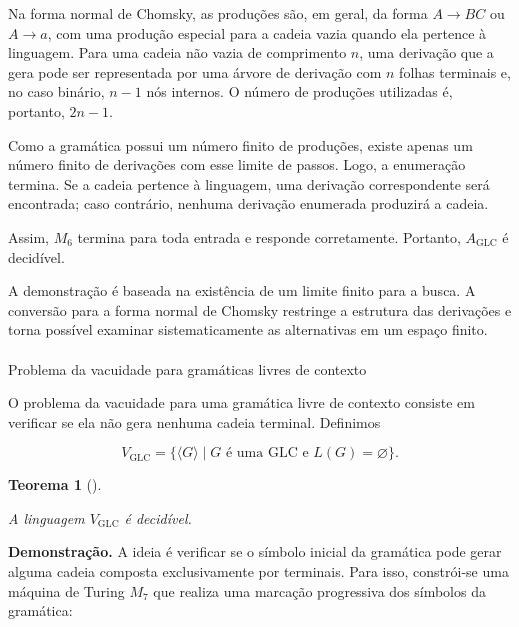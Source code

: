 \documentclass[
  brazilian,
  letterpaper,
]{book}
\makeatletter
\let\oldparagraph\paragraph
\renewcommand{\paragraph}{
    \@ifstar
      \xxxParagraphStar
      \xxxParagraphNoStar
  }
\newcommand{\xxxParagraphStar}[1]{\oldparagraph*{#1}\mbox{}}
\newcommand{\xxxParagraphNoStar}[1]{\oldparagraph{#1}\mbox{}}
\theoremstyle{plain}
\newtheorem{theorem}{Teorema}[chapter]
\theoremstyle{definition}
\theoremstyle{remark}
\makeatother
\begin{document}
Na forma normal de Chomsky, as produções são, em geral, da forma
\(A\rightarrow BC\) ou \(A\rightarrow a\), com uma produção especial
para a cadeia vazia quando ela pertence à linguagem. Para uma cadeia não
vazia de comprimento \(n\), uma derivação que a gera pode ser
representada por uma árvore de derivação com \(n\) folhas terminais e,
no caso binário, \(n-1\) nós internos. O número de produções utilizadas
é, portanto, \(2n-1\).

Como a gramática possui um número finito de produções, existe apenas um
número finito de derivações com esse limite de passos. Logo, a
enumeração termina. Se a cadeia pertence à linguagem, uma derivação
correspondente será encontrada; caso contrário, nenhuma derivação
enumerada produzirá a cadeia.

Assim, \(M_6\) termina para toda entrada e responde corretamente.
Portanto, \(A_{\mathrm{GLC}}\) é decidível.

A demonstração é baseada na existência de um limite finito para a busca.
A conversão para a forma normal de Chomsky restringe a estrutura das
derivações e torna possível examinar sistematicamente as alternativas em
um espaço finito.

\paragraph{Problema da vacuidade para gramáticas livres de
contexto}\label{problema-da-vacuidade-para-gramuxe1ticas-livres-de-contexto}

O problema da vacuidade para uma gramática livre de contexto consiste em
verificar se ela não gera nenhuma cadeia terminal. Definimos

\[
V_{\mathrm{GLC}}=\{\langle G\rangle\mid G\text{ é uma GLC e }L(G)=\varnothing\}.
\]

\begin{theorem}[]\protect\hypertarget{thm-glc-vazio}{}\label{thm-glc-vazio}

A linguagem \(V_{\mathrm{GLC}}\) é decidível.

\end{theorem}

\textbf{Demonstração.} A ideia é verificar se o símbolo inicial da
gramática pode gerar alguma cadeia composta exclusivamente por
terminais. Para isso, constrói-se uma máquina de Turing \(M_7\) que
realiza uma marcação progressiva dos símbolos da gramática:
\end{document}
